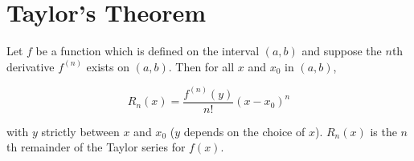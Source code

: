 \documentclass{article}
\begin{document}
\section{Taylor's Theorem}

Let $f$ be a function which is defined on the interval $(a,b)$ and suppose the $n$th derivative $f^{(n)}$ exists on $(a,b)$.  Then for all $x$ and $x_0$ in $(a,b)$,

$$ R_n(x) = \frac{f^{(n)}(y)}{n!}(x-x_0)^n $$

with $y$ strictly between $x$ and $x_0$ ($y$ depends on the choice of $x$).  $R_n(x)$ is the $n$th remainder of the Taylor series for $f(x)$.
\end{document}
